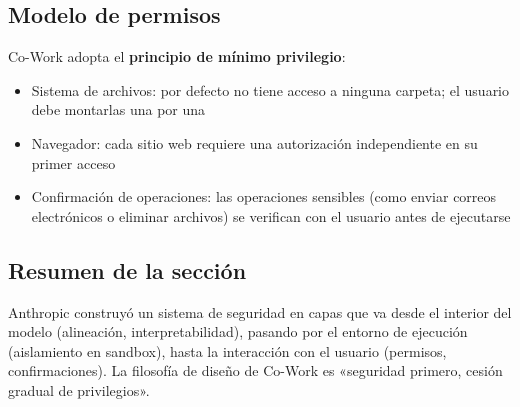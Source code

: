 \subsection{Modelo de permisos}

Co-Work adopta el \textbf{principio de mínimo privilegio}:

\begin{itemize}
    \item Sistema de archivos: por defecto no tiene acceso a ninguna carpeta; el usuario debe montarlas una por una
    \item Navegador: cada sitio web requiere una autorización independiente en su primer acceso
    \item Confirmación de operaciones: las operaciones sensibles (como enviar correos electrónicos o eliminar archivos) se verifican con el usuario antes de ejecutarse
\end{itemize}

\subsection{Resumen de la sección}

Anthropic construyó un sistema de seguridad en capas que va desde el interior del modelo (alineación, interpretabilidad), pasando por el entorno de ejecución (aislamiento en sandbox), hasta la interacción con el usuario (permisos, confirmaciones). La filosofía de diseño de Co-Work es «seguridad primero, cesión gradual de privilegios».


